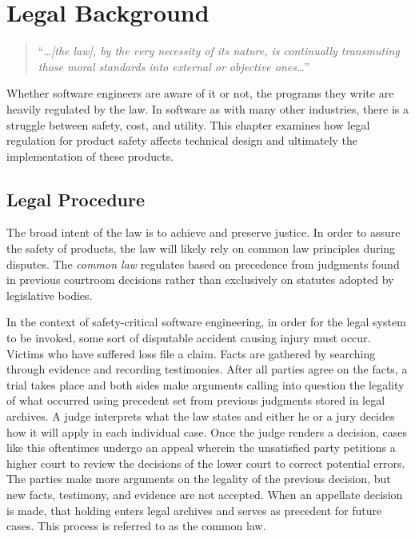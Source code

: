 \documentclass[12pt]{report}
\begin{document}
\chapter{Legal Background} 

\begin{quote}
``\textit{\ldots [the law], by the very necessity of its nature, is continually transmuting those moral standards into external or objective ones\ldots}''
\end{quote}

Whether software engineers are aware of it or not, the programs they write are heavily regulated by the law. In software as with many other industries, there is a struggle between safety, cost, and utility. This chapter examines how legal regulation for product safety affects technical design and ultimately the implementation of these products.

\section{Legal Procedure} 

The broad intent of the law is to achieve and preserve justice. In order to assure the safety of products, the law will likely rely on common law principles during disputes. The \textit{common law} regulates based on precedence from judgments found in previous courtroom decisions rather than exclusively on statutes adopted by legislative bodies. 

In the context of safety-critical software engineering, in order for the legal system to be invoked, some sort of disputable accident causing injury must occur. Victims who have suffered loss file a claim. Facts are gathered by searching through evidence and recording testimonies. After all parties agree on the facts, a trial takes place and both sides make arguments calling into question the legality of what occurred using precedent set from previous judgments stored in legal archives. A judge interprets what the law states and either he or a jury decides how it will apply in each individual case. Once the judge renders a decision, cases like this oftentimes undergo an appeal wherein the unsatisfied party petitions a higher court to review the decisions of the lower court to correct potential errors. The parties make more arguments on the legality of the previous decision, but new facts, testimony, and evidence are not accepted. When an appellate decision is made, that holding enters legal archives and serves as precedent for future cases. This process is referred to as the common law. 
\end{document}
